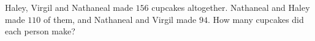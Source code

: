 Haley, Virgil and Nathaneal made $156$ cupcakes altogether. Nathaneal and Haley made $110$ of them, and Nathaneal and Virgil made $94$. How many cupcakes did each person make?
